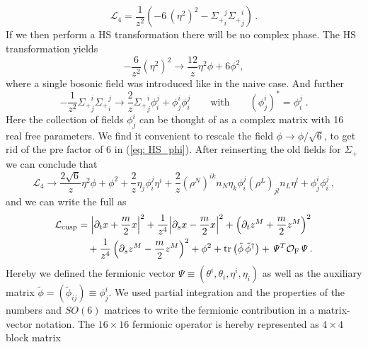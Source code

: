 %
%
\begin{equation}
\mathcal{L}_4= \frac{1}{z^2}\left(- 6\, (\eta^2)^2 - {\Sigma_{+}}_i^j{\Sigma_{+}}_j^i \right)\,.
\end{equation}
%
%
If we then perform a HS transformation there will be no complex phase. The HS transformation yields
%
%
\begin{equation}
 -\frac{6}{z^2}(\eta^2)^2\to \frac{12}{z} \eta^2 \phi +6\phi^2,
 \label{eq: HS_phi}
\end{equation}
%
%
where a single bosonic field was introduced like in the naive case. And further
%
%
\begin{equation}
-\frac{1}{z^{2}}{\Sigma_{+}}^{i}_{j}{\Sigma_{+}}^{j}_{i} \rightarrow \frac{2}{z}{\Sigma_{+}}^{i}_{j}\phi^{j}_{i} + \phi^{i}_{j}\phi^{j}_{i}
\qquad \text{with} \qquad \left(\phi^{i}_{j}\right)^{\ast} = \phi^{j}_{i}\;.
\end{equation}
%
%
Here the collection of fields $\phi^{i}_{j}$ can be thought of as a complex  matrix with 16 real free parameters. We find it convenient to rescale the field $\phi \to \phi / \sqrt{6}$, to get rid of the pre factor of 6 in (\ref{eq: HS_phi}). After reinserting the old fields for $\Sigma_{+}$ we can conclude that
%
%
\begin{equation}
 \mathcal{L}_4\to \frac{2\sqrt{6}}{z} \eta^2 \phi +\phi^2+\frac{2}{z}\eta_j \phi^j_i \eta^i +\frac{2}{z} (\rho^N)^{ik}n_N \eta_k\phi^j_i  (\rho^L)_{jl}n_L  \eta^l+\phi^i_j \phi^j_i\,,
\end{equation}
%
%
and we can write the full  as
%
%
\begin{align}
\mathcal{L}_{\rm cusp} &=  {\left\vert \partial_t {x} + {\frac{m}{2}}{x} \right\vert}^2 + \frac{1}{{ z}^4}{\left\vert \partial_s {x} -\frac{m}{2}{x} \right\vert}^2 + \left(\partial_t {z}^M + \frac{m}{2}{z}^M \right)^2 \\ &\quad+ \frac{1}{{ z}^4} \left(\partial_s {z}^M -\frac{m}{2}{z}^M\right)^2
+ \phi^2 + {\rm tr} \left( \tilde{\phi}\, \tilde{\phi}^{\dagger} \right) + \mathit{\Psi}^T \mathcal{O}_{\rm F} \mathit{\Psi} \,. \notag
\end{align}
%
%
Hereby we defined the fermionic vector $\mathit{\Psi}\equiv (\theta^{i},\theta_{i},\eta^{i},\eta_{i})$ as well as the auxiliary matrix ${\tilde{\phi}= (\tilde{\phi}_{ij}) \equiv \phi^{i}_{j}}$. We used partial integration and the properties of the  numbers and $SO(6)$ matrices to write the fermionic contribution in a matrix-vector notation. The $16\times 16$ fermionic operator is hereby represented as $4\times 4$ block matrix
